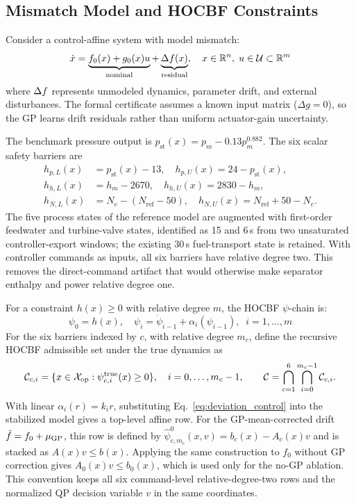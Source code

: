 \subsection{Mismatch Model and HOCBF Constraints}

Consider a control-affine system with model mismatch:
\begin{equation}
    \dot{x} = \underbrace{f_0(x) + g_0(x)u}_{\text{nominal}} + \underbrace{\Delta f(x)}_{\text{residual}}, \quad x \in \mathbb{R}^n, \; u \in \mathcal{U} \subset \mathbb{R}^m
    \label{eq:true}
\end{equation}
where $\Delta f$ represents unmodeled dynamics, parameter drift, and external disturbances. The formal certificate assumes a known input matrix ($\Delta g=0$), so the GP learns drift residuals rather than uniform actuator-gain uncertainty.

The benchmark pressure output is $p_{\mathrm{st}}(x)=p_m-0.13p_m^{0.882}$. The six scalar safety barriers are
\begin{align}
    h_{p,L}(x)&=p_{\mathrm{st}}(x)-13,\quad h_{p,U}(x)=24-p_{\mathrm{st}}(x), \nonumber\\
    h_{h,L}(x)&=h_m-2670,\quad h_{h,U}(x)=2830-h_m, \label{eq:barriers}\\
    h_{N,L}(x)&=N_e-(N_{\mathrm{ref}}-50),\quad h_{N,U}(x)=N_{\mathrm{ref}}+50-N_e. \nonumber
\end{align}
The five process states of the reference model are augmented with first-order feedwater and turbine-valve states, identified as 15 and 6\,s from two unsaturated controller-export windows; the existing 30\,s fuel-transport state is retained. With controller commands as inputs, all six barriers have relative degree two. This removes the direct-command artifact that would otherwise make separator enthalpy and power relative degree one.

For a constraint $h(x) \geq 0$ with relative degree $m$, the HOCBF $\psi$-chain is:
\begin{equation}
    \psi_0 = h(x), \quad \psi_i = \dot{\psi}_{i-1} + \alpha_i(\psi_{i-1}), \;\; i=1,\ldots,m
    \label{eq:psi}
\end{equation}
For the six barriers indexed by $c$, with relative degree $m_c$, define the recursive HOCBF admissible set under the true dynamics as
\begin{equation}
    \mathcal{C}_{c,i}=\{x\in\mathcal{X}_{\mathrm{op}}:\psi_{c,i}^{\mathrm{true}}(x)\geq 0\},
    \quad i=0,\ldots,m_c-1,
    \qquad
    \mathcal{C}=\bigcap_{c=1}^{6}\bigcap_{i=0}^{m_c-1}\mathcal{C}_{c,i}.
    \label{eq:hocbf_safe_set}
\end{equation}
With linear $\alpha_i(r)=k_i r$, substituting Eq.~\eqref{eq:deviation_control} into the stabilized model gives a top-level affine row. For the GP-mean-corrected drift $\hat{f}=f_0+\mu_{\mathrm{GP}}$, this row is defined by $\hat{\psi}_{c,m_c}^0(x,v)=b_c(x)-A_c(x)v$ and is stacked as $A(x)v\leq b(x)$. Applying the same construction to $f_0$ without GP correction gives $A_0(x)v\leq b_0(x)$, which is used only for the no-GP ablation. This convention keeps all six command-level relative-degree-two rows and the normalized QP decision variable $v$ in the same coordinates.


